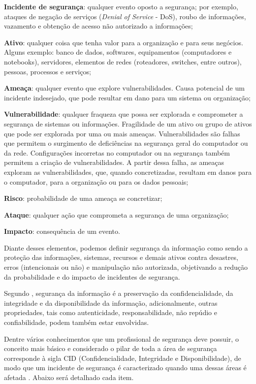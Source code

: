 \begin{alineas}
\item \textbf{Incidente de segurança}: qualquer evento oposto a segurança; por exemplo, ataques de negação de serviços (\textit{Denial of Service} - DoS), roubo de informações, vazamento e obtenção de acesso não autorizado a informações;
 \item \textbf{Ativo}: qualquer coisa que tenha valor para a organização e para seus negócios. Alguns exemplo: banco de dados, softwares, equipamentos (computadores e notebooks), servidores, elementos de redes (roteadores, switches, entre outros), pessoas, processos e serviços;
 \item \textbf{Ameaça}: qualquer evento que explore vulnerabilidades. Causa potencial de um incidente indesejado, que pode resultar em dano para um sistema ou organização;
 \item \textbf{Vulnerabilidade}: qualquer fraqueza que possa ser explorada e comprometer a segurança de sistemas ou informações. Fragilidade de um ativo ou grupo de ativos que pode ser explorada por uma ou mais ameaças. Vulnerabilidades são falhas que permitem o surgimento de deficiências na segurança geral do computador ou da rede. Configurações incorretas no computador ou na segurança também permitem a criação de vulnerabilidades. A partir dessa falha, as ameaças exploram as vulnerabilidades, que, quando concretizadas, resultam em danos para o computador, para a organização ou para os dados pessoais;
 \item \textbf{Risco}: probabilidade de uma ameaça se concretizar;
 \item \textbf{Ataque}: qualquer ação que comprometa a segurança de uma organização;
 \item \textbf{Impacto}: consequência de um evento.
\end{alineas}

Diante desses elementos, podemos definir segurança da informação como sendo a proteção das informações, sistemas, recursos e demais ativos contra desastres, erros (intencionais ou não) e manipulação não autorizada, objetivando a redução da probabilidade e do impacto de incidentes de segurança.

Segundo \cite{isoiec27002}, segurança da informação é a preservação da confidencialidade, da integridade e da disponibilidade da informação, adicionalmente, outras propriedades, tais como autenticidade, responsabilidade, não repúdio e confiabilidade, podem também estar envolvidas.

Dentre vários conhecimentos que um profissional de segurança deve possuir, o conceito mais básico e considerado o pilar de toda a área de segurança corresponde à sigla CID (Confidencialidade, Integridade e Disponibilidade), de modo que um incidente de segurança é caracterizado quando uma dessas áreas é afetada \cite{seg-redes-sistemas}. Abaixo será detalhado cada item.

